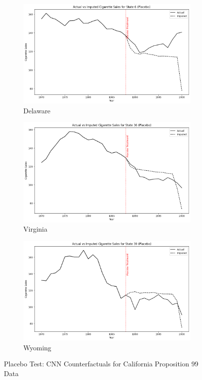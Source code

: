 \begin{figure}[htbp]
    \centering
    \begin{subfigure}[c]{0.3\textwidth}
        \includegraphics[width=\textwidth]{../figures/cnn-2.png}
        \caption{Delaware}
        \label{fig:placebo_1}
    \end{subfigure}
    \begin{subfigure}[c]{0.3\textwidth}
        \includegraphics[width=\textwidth]{../figures/cnn-3.png}
        \caption{Virginia}
        \label{fig:placebo_2}
    \end{subfigure}
    \begin{subfigure}[c]{0.3\textwidth}
        \includegraphics[width=\textwidth]{../figures/cnn-4.png}
        \caption{Wyoming}
        \label{fig:placebo_3}
    \end{subfigure}
    \caption{Placebo Test: CNN Counterfactuals for California Proposition 99 Data}
    \label{fig:placebo_cnn}
\end{figure}


